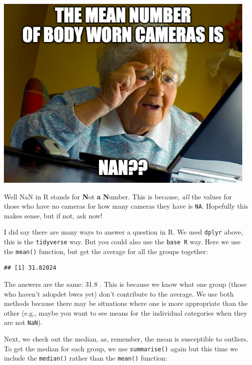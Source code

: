 \documentclass[
]{book}
\newenvironment{Shaded}{\begin{snugshade}}{\end{snugshade}}
\newcommand{\AttributeTok}[1]{\textcolor[rgb]{0.77,0.63,0.00}{#1}}
\newcommand{\ConstantTok}[1]{\textcolor[rgb]{0.00,0.00,0.00}{#1}}
\newcommand{\FunctionTok}[1]{\textcolor[rgb]{0.00,0.00,0.00}{#1}}
\newcommand{\NormalTok}[1]{#1}
\newcommand{\SpecialCharTok}[1]{\textcolor[rgb]{0.00,0.00,0.00}{#1}}
\begin{document}
\includegraphics{Images/nan.png}

Well NaN in R stands for \textbf{N}ot \textbf{a} \textbf{N}umber. This is because, \emph{all} the values for those who have no cameras for how many cameras they have is \texttt{NA}. Hopefully this makes sense, but if not, ask now!

I did say there are many ways to answer a question in R. We used \texttt{dplyr} above, this is the \texttt{tidyverse} way. But you could also use the \texttt{base\ R} way. Here we use the \texttt{mean()} function, but get the average for all the groups together:

\begin{Shaded}
\end{Shaded}

\begin{verbatim}
## [1] 31.82024
\end{verbatim}

The answers are the same: 31.8 . This is because we know what one group (those who haven't adopdet bwcs yet) don't contribute to the average. We use both methods because there may be situations where one is more appropriate than the other (e.g., maybe you want to see means for the individual categories when they are not \texttt{NaN}).

Next, we check out the median, as, remember, the mean is susceptible to outliers. To get the median for each group, we use \texttt{summarise()} again but this time we include the \texttt{median()} rather than the \texttt{mean()} function:
\end{document}
